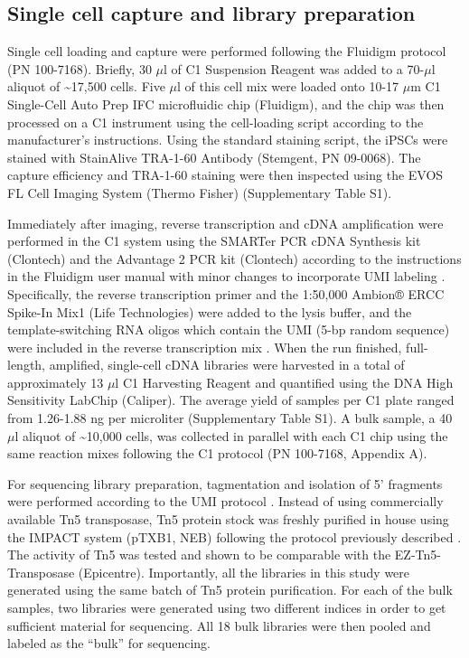 \subsection{Single cell capture and library
preparation}\label{single-cell-capture-and-library-preparation}

Single cell loading and capture were performed following the Fluidigm
protocol (PN 100-7168). Briefly, 30 $\mu$l of C1 Suspension Reagent was
added to a 70-$\mu$l aliquot of \textasciitilde{}17,500 cells. Five
$\mu$l of this cell mix were loaded onto 10-17 $\mu$m C1 Single-Cell
Auto Prep IFC microfluidic chip (Fluidigm), and the chip was then
processed on a C1 instrument using the cell-loading script according to
the manufacturer's instructions. Using the standard staining script, the
iPSCs were stained with StainAlive TRA-1-60 Antibody (Stemgent, PN
09-0068). The capture efficiency and TRA-1-60 staining were then
inspected using the EVOS FL Cell Imaging System (Thermo Fisher)
(Supplementary Table S1).

Immediately after imaging, reverse transcription and cDNA amplification
were performed in the C1 system using the SMARTer PCR cDNA Synthesis kit
(Clontech) and the Advantage 2 PCR kit (Clontech) according to the
instructions in the Fluidigm user manual with minor changes to
incorporate UMI labeling \citep{Islam2014}. Specifically, the reverse
transcription primer and the 1:50,000 Ambion® ERCC Spike-In Mix1 (Life
Technologies) were added to the lysis buffer, and the template-switching
RNA oligos which contain the UMI (5-bp random sequence) were included in
the reverse transcription mix \citep{Islam2011, Islam2012, Islam2014}.
When the run finished, full-length, amplified, single-cell cDNA
libraries were harvested in a total of approximately 13 $\mu$l C1
Harvesting Reagent and quantified using the DNA High Sensitivity LabChip
(Caliper). The average yield of samples per C1 plate ranged from
1.26-1.88 ng per microliter (Supplementary Table S1). A bulk sample, a
40 $\mu$l aliquot of \textasciitilde{}10,000 cells, was collected in
parallel with each C1 chip using the same reaction mixes following the
C1 protocol (PN 100-7168, Appendix A).

For sequencing library preparation, tagmentation and isolation of 5'
fragments were performed according to the UMI protocol \citep{Islam2014}.
Instead of using commercially available Tn5 transposase, Tn5 protein
stock was freshly purified in house using the IMPACT system (pTXB1, NEB)
following the protocol previously described \citep{Picelli2014}. The
activity of Tn5 was tested and shown to be comparable with the
EZ-Tn5-Transposase (Epicentre). Importantly, all the libraries in this
study were generated using the same batch of Tn5 protein purification.
For each of the bulk samples, two libraries were generated using two
different indices in order to get sufficient material for sequencing.
All 18 bulk libraries were then pooled and labeled as the ``bulk'' for
sequencing.

